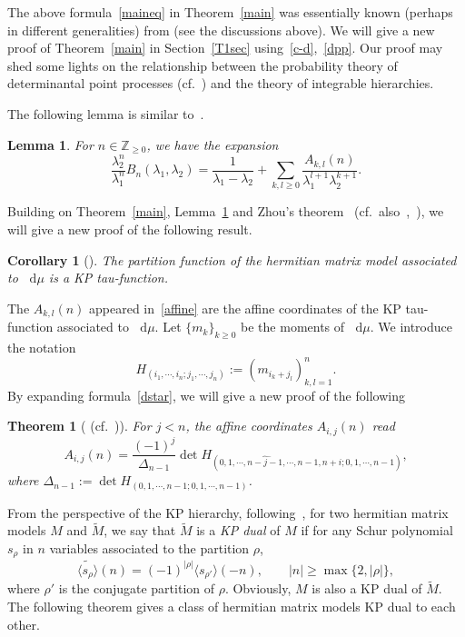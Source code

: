 \documentclass[a4paper]{article}
\theoremstyle{plain}
\newtheorem{thm}{Theorem}
\newtheorem{lem}{Lemma}
\newtheorem{cor}{Corollary}
\theoremstyle{definition}
\newcommand{\dif}{\mathop{}\!\mathrm{d}}
\newcommand{\ZZ}{\mathbb{Z}}
\begin{document}
The above formula~\eqref{maineq} in Theorem~\ref{main} was essentially known (perhaps in different generalities) 
	from \cite{DY,Ruzza,Toda,Yin} (see the discussions above).
We will give a new proof of Theorem~\ref{main} in Section~\ref{T1sec} using~\eqref{c-d},~\eqref{dpp}. Our proof may shed some lights on the relationship between the probability theory of determinantal point processes (cf.~\cite{DPP}) and the theory of integrable hierarchies.

	The following lemma is similar to~\cite[Lemma 4.4]{YZ}.

\begin{lem} \label{exp-an}
	For $n\in\ZZ_{\ge0}$, we have the expansion
	\begin{equation}
		\frac{\lambda_2^n}{\lambda_1^n}B_n(\lambda_1,\lambda_2)=\frac{1}{\lambda_1-\lambda_2}+\sum_{k,l\ge0}\frac{A_{k,l}(n)}{\lambda_1^{l+1}\lambda_2^{k+1}}.\label{affine}
	\end{equation}
\end{lem}

Building on Theorem~\ref{main}, Lemma~\ref{exp-an} and Zhou's theorem~\cite{Emergent} (cf.~also~\cite[Corollary 2.2]{YZ},~\cite[Lemma 3.1]{xy}), we will give a new proof of the following result.
\begin{cor}[\cite{HH,Painleve,Yin,Zhou1}] \label{KPthm}
	The partition function of the hermitian matrix model associated to $\dif\mu$ is a KP tau-function.
\end{cor}

The $A_{k,l}(n)$ appeared in~\eqref{affine} are the affine coordinates of the KP tau-function associated to $\dif\mu$. Let $\{m_k\}_{k\ge0}$ be the moments of $\dif\mu$. We introduce the notation
\begin{equation}
	H_{(i_1,\cdots,i_n;j_1,\cdots,j_n)}:=(m_{i_k+j_l})_{k,l=1}^n.
\end{equation}
By expanding formula~\eqref{dstar}, we will give a new proof of the following

	\begin{thm}[\cite{Zhou1} (cf.~\cite{Painleve})] \label{hankel}
		For $j<n$, the affine coordinates $A_{i,j}(n)$ read
		\begin{equation} \label{hk}
			A_{i,j}(n)=\frac{(-1)^j}{\Delta_{n-1}}\det H_{(0,1,\cdots,\widehat{n-j-1},\cdots,n-1,n+i;0,1,\cdots,n-1)},
		\end{equation}
		where $\Delta_{n-1}:=\det H_{(0,1,\cdots,n-1;0,1,\cdots,n-1)}$.
	\end{thm}

	From the perspective of the KP hierarchy, following~\cite{Zhou2,Zhou3}, for two hermitian matrix models $M$ and $\widetilde M$, we say that $\widetilde M$ is a {\it KP dual} of $M$ if for any Schur polynomial $s_\rho$ in $n$ variables associated to the partition $\rho$,
\begin{equation}
	\widetilde{\langle s_\rho\rangle}(n)=(-1)^{|\rho|}\langle s_{\rho'}\rangle(-n),\qquad |n|\ge\max\{2,|\rho|\},
\end{equation}
where $\rho'$ is the conjugate partition of $\rho$. Obviously, $M$ is also a KP dual of $\widetilde M$. The following theorem gives a class of hermitian matrix models KP dual to each other.
\end{document}
